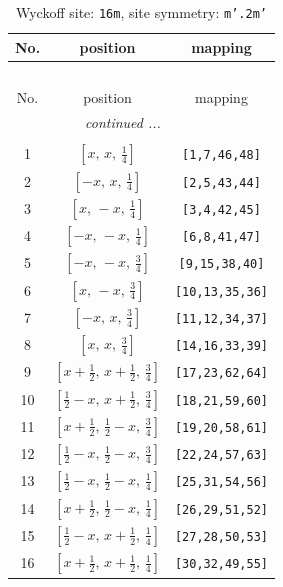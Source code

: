 \documentclass[fleqn,8pt]{jsarticle}
\begin{document}
\renewcommand{\arraystretch}{1.2}
\begin{longtable}{ccc}
\caption{Wyckoff site: {\tt 16m}, site symmetry: {\tt m'.2m'}}
 \\
 \hline \hline
No. & position & mapping \\ \hline \endfirsthead

\multicolumn{2}{l}{\tablename\ \thetable{}} \\
 \hline \hline
No. & position & mapping \\ \hline \endhead

 \hline \hline
\multicolumn{2}{r}{\footnotesize\it continued ...} \\ \endfoot

 \hline \hline
\multicolumn{2}{r}{} \\ \endlastfoot

1 & $\left[ x,\, x,\, \frac{1}{4} \right]$ & {\tt [1,7,46,48]} \\ \hline
2 & $\left[ - x,\, x,\, \frac{1}{4} \right]$ & {\tt [2,5,43,44]} \\ \hline
3 & $\left[ x,\, - x,\, \frac{1}{4} \right]$ & {\tt [3,4,42,45]} \\ \hline
4 & $\left[ - x,\, - x,\, \frac{1}{4} \right]$ & {\tt [6,8,41,47]} \\ \hline
5 & $\left[ - x,\, - x,\, \frac{3}{4} \right]$ & {\tt [9,15,38,40]} \\ \hline
6 & $\left[ x,\, - x,\, \frac{3}{4} \right]$ & {\tt [10,13,35,36]} \\ \hline
7 & $\left[ - x,\, x,\, \frac{3}{4} \right]$ & {\tt [11,12,34,37]} \\ \hline
8 & $\left[ x,\, x,\, \frac{3}{4} \right]$ & {\tt [14,16,33,39]} \\ \hline
9 & $\left[ x + \frac{1}{2},\, x + \frac{1}{2},\, \frac{3}{4} \right]$ & {\tt [17,23,62,64]} \\ \hline
10 & $\left[ \frac{1}{2} - x,\, x + \frac{1}{2},\, \frac{3}{4} \right]$ & {\tt [18,21,59,60]} \\ \hline
11 & $\left[ x + \frac{1}{2},\, \frac{1}{2} - x,\, \frac{3}{4} \right]$ & {\tt [19,20,58,61]} \\ \hline
12 & $\left[ \frac{1}{2} - x,\, \frac{1}{2} - x,\, \frac{3}{4} \right]$ & {\tt [22,24,57,63]} \\ \hline
13 & $\left[ \frac{1}{2} - x,\, \frac{1}{2} - x,\, \frac{1}{4} \right]$ & {\tt [25,31,54,56]} \\ \hline
14 & $\left[ x + \frac{1}{2},\, \frac{1}{2} - x,\, \frac{1}{4} \right]$ & {\tt [26,29,51,52]} \\ \hline
15 & $\left[ \frac{1}{2} - x,\, x + \frac{1}{2},\, \frac{1}{4} \right]$ & {\tt [27,28,50,53]} \\ \hline
16 & $\left[ x + \frac{1}{2},\, x + \frac{1}{2},\, \frac{1}{4} \right]$ & {\tt [30,32,49,55]} \\
\end{longtable}
\end{document}
